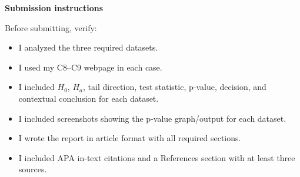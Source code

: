\documentclass[12pt]{article}
\newcommand{\SubsectionBox}[1]{%
\noindent\colorbox{gray!30}{%
\parbox{\linewidth}{\textbf{#1}}%
}\par\vspace{0.35cm}%
}
\begin{document}
\SubsectionBox{Submission instructions}
Before submitting, verify:
\begin{itemize}
\item[$\square$] I analyzed the three required datasets.
\item[$\square$] I used my C8--C9 webpage in each case.
\item[$\square$] I included \(H_0\), \(H_a\), tail direction, test statistic, p-value, decision, and contextual conclusion for each dataset.
\item[$\square$] I included screenshots showing the p-value graph/output for each dataset.
\item[$\square$] I wrote the report in article format with all required sections.
\item[$\square$] I included APA in-text citations and a References section with at least three sources.
\end{itemize}
\end{document}
